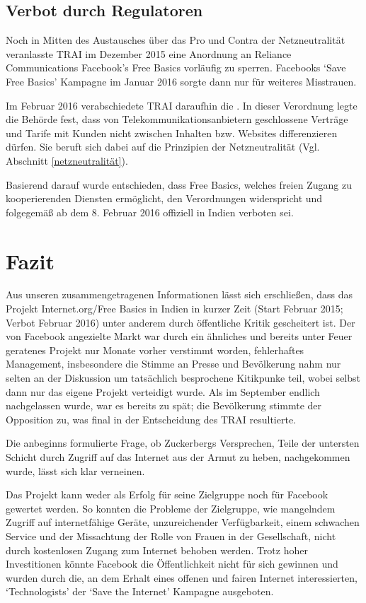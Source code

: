 \documentclass{article}
\begin{document}
\subsection{Verbot durch Regulatoren}

Noch in Mitten des Austausches über das Pro und Contra der Netzneutralität veranlasste TRAI im Dezember 2015 eine Anordnung an Reliance Communications Facebook's Free Basics vorläufig zu sperren\autocite{governanceAsIdeology}.
Facebooks `Save Free Basics' Kampagne im Januar 2016 sorgte dann nur für weiteres Misstrauen.

Im Februar 2016 verabschiedete TRAI daraufhin die \textcite{regulationBan}.
In dieser Verordnung legte die Behörde fest, dass von Telekommunikationsanbietern geschlossene Verträge und Tarife mit Kunden nicht zwischen Inhalten bzw. Websites differenzieren dürfen.
Sie beruft sich dabei auf die Prinzipien der Netzneutralität (Vgl. Abschnitt \ref{netzneutralität}).

Basierend darauf wurde entschieden, dass Free Basics, welches freien Zugang zu kooperierenden Diensten ermöglicht, den
Verordnungen widerspricht und folgegemäß ab dem 8. Februar 2016 offiziell in Indien verboten sei.

\break
\section{Fazit}

Aus unseren zusammengetragenen Informationen lässt sich erschließen, dass das Projekt Internet.org/Free Basics in Indien in kurzer Zeit (Start Februar 2015; Verbot Februar 2016) unter anderem durch öffentliche Kritik gescheitert ist.
Der von Facebook angezielte Markt war durch ein ähnliches und bereits unter Feuer geratenes Projekt nur Monate vorher verstimmt worden, fehlerhaftes Management, insbesondere die Stimme an Presse und Bevölkerung nahm nur selten an der Diskussion um tatsächlich besprochene Kitikpunke teil, wobei selbst dann nur das eigene Projekt verteidigt wurde.
Als im September endlich nachgelassen wurde, war es bereits zu spät; die Bevölkerung stimmte der Opposition zu, was final in der Entscheidung des TRAI resultierte.

\medskip

Die anbeginns formulierte Frage, ob Zuckerbergs Versprechen, Teile der untersten Schicht durch Zugriff auf das Internet aus der Armut zu heben, nachgekommen wurde, lässt sich klar verneinen.

Das Projekt kann weder als Erfolg für seine Zielgruppe noch für Facebook gewertet werden. So konnten die Probleme der Zielgruppe, wie mangelndem Zugriff auf internetfähige Geräte, unzureichender Verfügbarkeit, einem schwachen Service und der Missachtung der Rolle von Frauen in der Gesellschaft, nicht durch kostenlosen Zugang zum Internet behoben werden. Trotz hoher Investitionen könnte Facebook die Öffentlichkeit nicht für sich gewinnen und wurden durch die, an dem Erhalt eines offenen und fairen Internet interessierten, `Technologists' der `Save the Internet' Kampagne ausgeboten.
\end{document}
